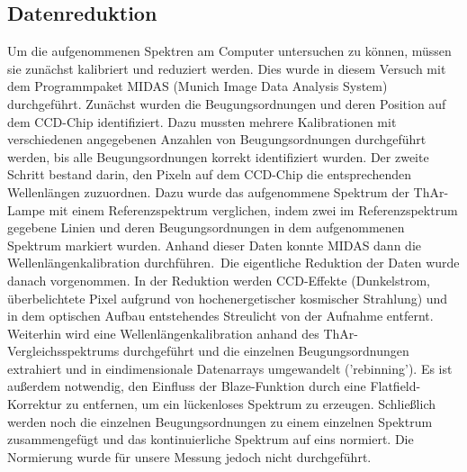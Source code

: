 \subsection{Datenreduktion}
Um die aufgenommenen Spektren am Computer untersuchen zu können, müssen sie zunächst kalibriert und reduziert werden. Dies wurde in diesem Versuch mit dem Programmpaket MIDAS (Munich Image Data Analysis System) durchgeführt. Zunächst wurden die Beugungsordnungen und deren Position auf dem CCD-Chip identifiziert. Dazu mussten mehrere Kalibrationen mit verschiedenen angegebenen Anzahlen von Beugungsordnungen durchgeführt werden, bis alle Beugungsordnungen korrekt identifiziert wurden. Der zweite Schritt bestand darin, den Pixeln auf dem CCD-Chip die entsprechenden Wellenlängen zuzuordnen. Dazu wurde das aufgenommene Spektrum der ThAr-Lampe mit einem Referenzspektrum verglichen, indem zwei im Referenzspektrum gegebene Linien und deren Beugungsordnungen in dem aufgenommenen Spektrum markiert wurden. Anhand dieser Daten konnte MIDAS dann die Wellenlängenkalibration durchführen.\
Die eigentliche Reduktion der Daten wurde danach vorgenommen. In der Reduktion werden CCD-Effekte (Dunkelstrom, überbelichtete Pixel aufgrund von hochenergetischer kosmischer Strahlung) und in dem optischen Aufbau entstehendes Streulicht von der Aufnahme entfernt. Weiterhin wird eine Wellenlängenkalibration anhand des ThAr-Vergleichsspektrums durchgeführt und die einzelnen Beugungsordnungen extrahiert und in eindimensionale Datenarrays umgewandelt ('rebinning'). Es ist außerdem notwendig, den Einfluss der Blaze-Funktion durch eine Flatfield-Korrektur zu entfernen, um ein lückenloses Spektrum zu erzeugen. Schließlich werden noch die einzelnen Beugungsordnungen zu einem einzelnen Spektrum zusammengefügt und das kontinuierliche Spektrum auf eins normiert. Die Normierung wurde für unsere Messung jedoch nicht durchgeführt.  

